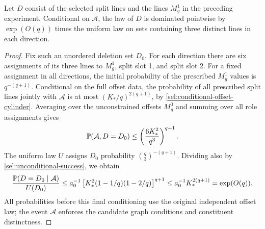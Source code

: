 \begin{corollary}
\label{sel:deletion-domination}
Let $D$ consist of the selected split lines and the lines $M_g^1$
in the preceding experiment.  Conditional on $\mathcal A$, the law
of $D$ is dominated pointwise by $\exp(O(q))$ times the uniform
law on sets containing three distinct lines in each direction.
\end{corollary}

\begin{proof}
Fix such an unordered deletion set $D_0$.  For each direction there
are six assignments of its three lines to $M_g^1$, split slot 1,
and split slot 2.  For a fixed assignment in all directions, the
initial probability of the prescribed $M_g^1$ values is
$q^{-(q+1)}$.  Conditional on the full offset data, the probability
of all prescribed split lines jointly with $\mathcal A$ is at most
$(K_*/q)^{2(q+1)}$, by
\eqref{sel:conditional-offset-cylinder}.  Averaging over the
unconstrained offsets $M_g^0$ and summing over all role assignments
gives
\[
 \mathbb P(\mathcal A,D=D_0)
 \le\left(\frac{6K_*^2}{q^3}\right)^{q+1}.
\]
The uniform law $U$ assigns $D_0$ probability
$\binom q3^{-(q+1)}$.  Dividing also by
\eqref{sel:unconditional-success}, we obtain
\begin{equation}\label{sel:deletion-ratio}
 \frac{\mathbb P(D=D_0\mid\mathcal A)}{U(D_0)}
 \le a_0^{-1}\left[K_*^2(1-1/q)(1-2/q)\right]^{q+1}
 \le a_0^{-1}K_*^{2(q+1)}=\exp(O(q)).
\end{equation}
All probabilities before this final conditioning use the original
independent offset law; the event $\mathcal A$ enforces the candidate
graph conditions and constituent distinctness.
\end{proof}
